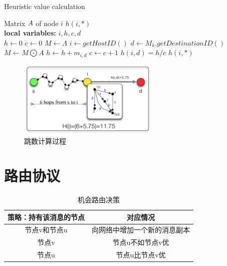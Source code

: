 \begin{algorithm}[tbp] %
\caption{Heuristic value calculation} %
\label{alg:chap5_heuristic} %
\begin{algorithmic}[1] %
\REQUIRE  %
Matrix $\boldmath{A}$ of node $i$
\ENSURE  %
$h(i,*)$\\
\textbf{local variables:} $i,h,c,d$ \\
    \STATE $h\leftarrow 0$
    \STATE $c\leftarrow 0$
    \STATE $M\leftarrow \Lambda$
    \STATE $i\leftarrow getHostID()$
    \STATE $d\leftarrow M_k.getDestinationID()$
    \REPEAT
        \STATE $M\leftarrow M\bigodot A$
        \STATE $h\leftarrow h+m_{i,d}$
        \STATE $c\leftarrow c+1$
    \STATE $h(i,d)=h/c$
\ENDFOR
\RETURN $h(i,*)$ %
\end{algorithmic}
\end{algorithm}

\begin{figure}[bt]
  \centering
  \includegraphics[width=0.6\textwidth]{paper-HCH/heuristic}
  \caption{跳数计算过程}
  \label{fig:heuristic}
\end{figure}

\section{路由协议}
\label{chap5:路由协议}

\begin{table}[bt]
  \caption{机会路由决策}
  \label{tab:chap5_routing}
  \centering
  \begin{tabular}{cc}
  \hline
   \textbf{策略：持有该消息的节点} & \textbf{对应情况}  \\
    \hline
    节点v和节点u & 向网络中增加一个新的消息副本\\
    节点v & 节点u不如节点v优\\
    节点u & 节点u比节点v优\\
    \hline
  \end{tabular}
\end{table}

